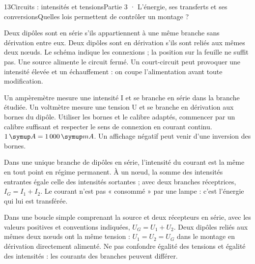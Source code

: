 \begin{ouverture}[college3]{13}{Circuits : intensités et tensions}{Partie 3 · L’énergie, ses transferts et ses conversions}{Quelles lois permettent de contrôler un montage ?}
\end{ouverture}
\label{ess-13}
Deux dipôles sont en série s’ils appartiennent à une même branche sans dérivation entre eux. Deux dipôles sont en dérivation s’ils sont reliés aux mêmes deux nœuds. Le schéma indique les connexions ; la position sur la feuille ne suffit pas. Une source alimente le circuit fermé. Un court-circuit peut provoquer une intensité élevée et un échauffement : on coupe l’alimentation avant toute modification.\par
{}
Un ampèremètre mesure une intensité I et se branche en série dans la branche étudiée. Un voltmètre mesure une tension U et se branche en dérivation aux bornes du dipôle. Utiliser les bornes et le calibre adaptés, commencer par un calibre suffisant et respecter le sens de connexion en courant continu. $1\unite A=1\,000\unite{mA}$. Un affichage négatif peut venir d’une inversion des bornes.\par
\clearpage
{}
Dans une unique branche de dipôles en série, l’intensité du courant est la même en tout point en régime permanent. À un nœud, la somme des intensités entrantes égale celle des intensités sortantes ; avec deux branches réceptrices, $I_G=I_1+I_2$. Le courant n’est pas « consommé » par une lampe : c’est l’énergie qui lui est transférée.\par
{}
Dans une boucle simple comprenant la source et deux récepteurs en série, avec les valeurs positives et conventions indiquées, $U_G=U_1+U_2$. Deux dipôles reliés aux mêmes deux nœuds ont la même tension : $U_1=U_2=U_G$ dans le montage en dérivation directement alimenté. Ne pas confondre égalité des tensions et égalité des intensités : les courants des branches peuvent différer.\par
